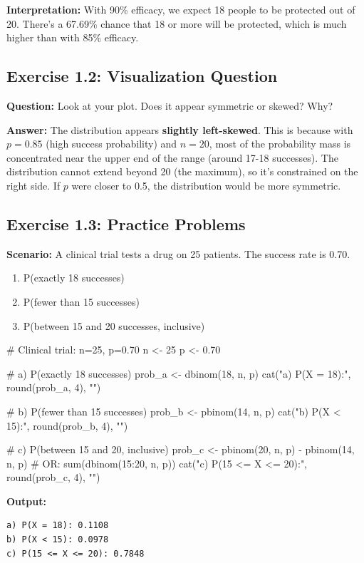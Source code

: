 \documentclass[11pt]{article}
\begin{document}
\textcolor{correctgreen}{\textbf{Interpretation:}} With 90\% efficacy, we expect 18 people to be protected out of 20. There's a 67.69\% chance that 18 or more will be protected, which is much higher than with 85\% efficacy.

\subsection{Exercise 1.2: Visualization Question}

\textbf{Question:} Look at your plot. Does it appear symmetric or skewed? Why?

\textcolor{correctgreen}{\textbf{Answer:}} The distribution appears \textbf{slightly left-skewed}. This is because with $p = 0.85$ (high success probability) and $n = 20$, most of the probability mass is concentrated near the upper end of the range (around 17-18 successes). The distribution cannot extend beyond 20 (the maximum), so it's constrained on the right side. If $p$ were closer to 0.5, the distribution would be more symmetric.

\subsection{Exercise 1.3: Practice Problems}

\textbf{Scenario:} A clinical trial tests a drug on 25 patients. The success rate is 0.70.

\begin{enumerate}[label=\alph*)]
\item P(exactly 18 successes)
\item P(fewer than 15 successes)
\item P(between 15 and 20 successes, inclusive)
\end{enumerate}

\begin{rcode}
# Clinical trial: n=25, p=0.70
n <- 25
p <- 0.70

# a) P(exactly 18 successes)
prob_a <- dbinom(18, n, p)
cat("a) P(X = 18):", round(prob_a, 4), "\n")

# b) P(fewer than 15 successes)
prob_b <- pbinom(14, n, p)
cat("b) P(X < 15):", round(prob_b, 4), "\n")

# c) P(between 15 and 20, inclusive)
prob_c <- pbinom(20, n, p) - pbinom(14, n, p)
# OR: sum(dbinom(15:20, n, p))
cat("c) P(15 <= X <= 20):", round(prob_c, 4), "\n")
\end{rcode}

\begin{routput}
\textbf{Output:}
\begin{verbatim}
a) P(X = 18): 0.1108
b) P(X < 15): 0.0978
c) P(15 <= X <= 20): 0.7848
\end{verbatim}
\end{routput}
\end{document}
